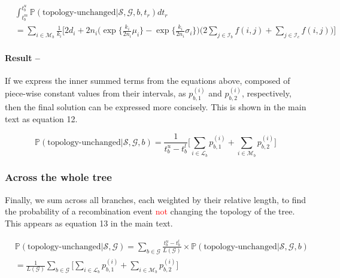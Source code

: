 \documentclass[11pt]{article}
\begin{document}
\begin{equation}
\begin{aligned}
	&\int_{t_b^m}^{t_b^u} \mathbb{P} (\textrm{topology-unchanged} | \mathcal{S}, \mathcal{G}, b, t_r) dt_r \\
	&= \sum_{i \in \mathcal{M}_b} \frac{1}{k_i} \Bigg[ 
		2d_i + 2n_i \bigg( 
			\exp \bigg\{ \frac{k_i}{2n_i} \mu_i \bigg\} - 
			\exp \bigg\{ \frac{k_i}{2n_i} \sigma_i \bigg\}
		\bigg) 
		\bigg(2 \sum_{j \in \mathcal{I}_b} f(i,j) + \sum_{j \in \mathcal{I}_c} f(i,j) \bigg)
	\Bigg]
\end{aligned}
\end{equation}

\paragraph{Result --}
If we express the inner summed terms from the equations above, composed of piece-wise
constant values from their intervals, as $p_{b,1}^{(i)}$ and $p_{b,2}^{(i)}$, 
respectively, then the final solution can be expressed more concisely. 
This is shown in the main text as equation 12.

\begin{equation}\tag{12}
     \mathbb{P}(\text{topology-unchanged} | \mathcal{S}, \mathcal{G}, b) = 
     \frac{1}{t_b^u - t_b^l} 
     \bigg[ 
	    \sum_{i \in \mathcal{L}_b} p_{b,1}^{(i)} + 
	    \sum_{i \in \mathcal{M}_b} p_{b,2}^{(i)}
	\bigg]
\end{equation}


\subsubsection{Across the whole tree}

Finally, we sum across all branches, each weighted by their relative length, 
to find the probability of a recombination event \textcolor{red}{not} changing the 
topology of the tree. This appears as equation 13 in the main text.

\begin{equation}\tag{13}
\begin{aligned}
    &\mathbb{P}(\text{topology-unchanged}| \mathcal{S}, \mathcal{G}) = 
    \sum_{b \in \mathcal{G}}
    \frac{t_b^u - t_b^l}
    {L(\mathcal{G})} \times \mathbb{P}(\text{topology-unchanged}| \mathcal{S}, \mathcal{G}, b) \\
    & = \frac{1}{L(\mathcal{G})} \sum_{b \in \mathcal{G}}
     \bigg[ 
	    \sum_{i \in \mathcal{L}_b} p_{b,1}^{(i)} + 
	    \sum_{i \in \mathcal{M}_b} p_{b,2}^{(i)}
	\bigg]
\end{aligned}
\end{equation}
\end{document}
